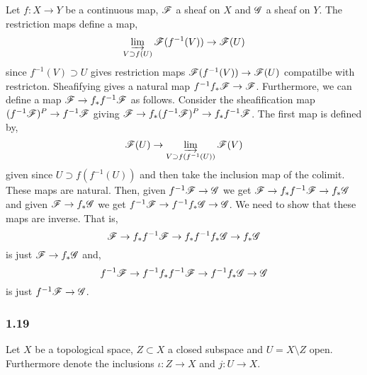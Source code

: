 \documentclass[12pt]{article}
\begin{document}
Let $f : X \to Y$ be a continuous map, $\mathscr{F}$ a sheaf on $X$ and $\mathscr{G}$ a sheaf on $Y$. The restriction maps define a map,
\[ \varinjlim_{V \supset f(U)} \mathscr{F}(f^{-1}(V)) \to \mathscr{F}(U) \]
since $f^{-1}(V) \supset U$ gives restriction maps $\mathscr{F}(f^{-1}(V)) \to \mathscr{F}(U)$ compatilbe with restricton. Sheafifying gives a natural map $f^{-1} f_* \mathscr{F} \to \mathscr{F}$. Furthermore, we can define a map $\mathscr{F} \to f_* f^{-1} \mathscr{F}$ as follows. Consider the sheafification map $(f^{-1} \mathscr{F})^P \to f^{-1} \mathscr{F}$ giving $\mathscr{F} \to f_* (f^{-1} \mathscr{F})^P \to f_* f^{-1} \mathscr{F}$. The first map is defined by,
\[ \mathscr{F}(U) \to \varinjlim_{V \supset f(f^{-1}(U))} \mathscr{F}(V) \]
given since $U \supset f(f^{-1}(U))$ and then take the inclusion map of the colimit. These maps are natural. Then, given $f^{-1} \mathscr{F} \to \mathscr{G}$ we get $\mathscr{F} \to f_* f^{-1} \mathscr{F} \to f_* \mathscr{G}$ and given $\mathscr{F} \to f_* \mathscr{G}$ we get $f^{-1} \mathscr{F} \to f^{-1} f_* \mathscr{G} \to \mathscr{G}$. We need to show that these maps are inverse. That is,
\[ \mathscr{F} \to f_* f^{-1} \mathscr{F} \to f_* f^{-1} f_* \mathscr{G} \to f_* \mathscr{G} \]
is just $\mathscr{F} \to f_* \mathscr{G}$ and,
\[ f^{-1} \mathscr{F} \to f^{-1} f_* f^{-1} \mathscr{F} \to f^{-1} f_* \mathscr{G} \to \mathscr{G} \]
is just $f^{-1} \mathscr{F} \to \mathscr{G}$. 

\subsubsection{1.19}

Let $X$ be a topological space, $Z \subset X$ a closed subspace and $U = X \setminus Z$ open. Furthermore denote the inclusions $\iota : Z \to X$ and $j : U \to X$. 
\end{document}
